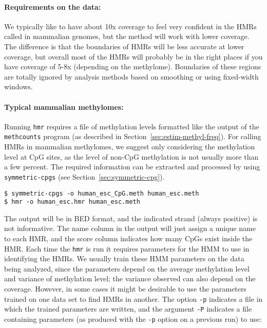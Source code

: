 \documentclass[10pt]{article}
\newcommand{\prog}[1]{\texttt{#1}}
\newcommand{\op}[1]{\texttt{#1}}
\begin{document}
\paragraph{Requirements on the data:}
We typically like to have about 10x coverage to feel very confident in
the HMRs called in mammalian genomes, but the method will work with
lower coverage. The difference is that the boundaries of HMRs will be
less accurate at lower coverage, but overall most of the HMRs will
probably be in the right places if you have coverage of 5-8x
(depending on the methylome). Boundaries of these regions are totally
ignored by analysis methods based on smoothing or using fixed-width
windows.

\paragraph{Typical mammalian methylomes:}
Running \prog{hmr} requires a file of methylation levels formatted
like the output of the \prog{methcounts} program (as described
in Section~\ref{sec:estim-methyl-freq}).
For calling HMRs in mammalian methylomes, we suggest only
considering the methylation level at CpG sites, as the level of non-CpG
methylation is not usually more than a few percent. The required information
can be extracted and processed by using \texttt{symmetric-cpgs}
(see Section~\ref{sec:symmetric-cpg}).

\begin{verbatim}
$ symmetric-cpgs -o human_esc_CpG.meth human_esc.meth
$ hmr -o human_esc.hmr human_esc.meth
\end{verbatim}

The output will be in BED format, and the indicated strand (always
positive) is not informative. The name column in the output will just
assign a unique name to each HMR, and the score column indicates how
many CpGs exist inside the HMR. Each time the \prog{hmr} is run it
requires parameters for the HMM to use in identifying the HMRs. We
usually train these HMM parameters on the data being analyzed, since
the parameters depend on the average methylation level and variance of
methylation level; the variance observed can also depend on the
coverage. However, in some cases it might be desirable to use the
parameters trained on one data set to find HMRs in another. The option
\op{-p} indicates a file in which the trained parameters are written,
and the argument \op{-P} indicates a file containing parameters (as
produced with the \op{-p} option on a previous run) to use:
\end{document}
